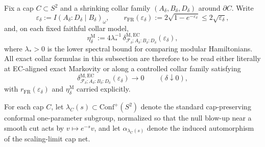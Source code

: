 Fix a cap \(C\subset S^2\) and a shrinking collar family \((A_\delta,B_\delta,D_\delta)\) around \(\partial C\). Write
\[
\varepsilon_\delta:=I(A_\delta:D_\delta\mid B_\delta)_\omega,
\qquad
r_{\mathrm{FR}}(\varepsilon_\delta):=
2\sqrt{1-e^{-\varepsilon_\delta}}
\le 2\sqrt{\varepsilon_\delta},
\]
and, on each fixed faithful collar model,
\[
\eta_\delta^{\mathrm M}
:=
4\lambda_\ast^{-1}\,
\delta^{\mathrm{M,EC}}_{\mathcal F_\delta;A_\delta:B_\delta:D_\delta}(\varepsilon_\delta),
\]
where \(\lambda_\ast>0\) is the lower spectral bound for comparing modular Hamiltonians. All exact collar formulas in this subsection are therefore to be read either literally at EC-aligned exact Markovity or along a controlled collar family satisfying
\[
\delta^{\mathrm{M,EC}}_{\mathcal F_\delta;A_\delta:B_\delta:D_\delta}(\varepsilon_\delta)\to 0
\qquad(\delta\downarrow 0),
\]
with \(r_{\mathrm{FR}}(\varepsilon_\delta)\) and \(\eta_\delta^{\mathrm M}\) carried explicitly.

For each cap \(C\), let \(\lambda_C(s)\subset \mathrm{Conf}^+(S^2)\) denote the standard cap-preserving conformal one-parameter subgroup, normalized so that the null blow-up near a smooth cut acts by \(v\mapsto e^{-s}v\), and let \(\alpha_{\lambda_C(s)}\) denote the induced automorphism of the scaling-limit cap net.


